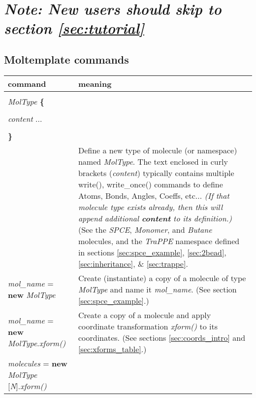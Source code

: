 \documentclass[11pt]{article}
\begin{document}
\section*{
\textit{Note: New users should skip to section \ref{sec:tutorial}}
}



\subsection{Moltemplate commands}

\begin{longtable}[h]{l|p{9cm}}
\textbf{command} & \textbf{meaning}
\\
\hline
\hline
\begin{tabular}[t]{l}
\\
\textit{MolType} \textbf{\{} \\
\\
\hspace{0.35cm} \textit{content} ... \\
\\
\textbf{\}} \\
\end{tabular}
& 
Define a new type of molecule (or namespace) named \textit{MolType}.
The text enclosed in curly brackets (\textit{content})
typically contains multiple write(), write\_once()
commands to define Atoms, Bonds, Angles, Coeffs, etc...
\textit{(If that molecule type exists already, 
then this will append additional \textbf{content} to its definition.)}
(See the \textit{SPCE}, \textit{Monomer}, and \textit{Butane} 
 molecules, and the \textit{TraPPE} namespace 
 defined in sections \ref{sec:spce_example}, \ref{sec:2bead},
 \ref{sec:inheritance}, \& \ref{sec:trappe}.
\\
\hline
\textit{mol\_name} = \textbf{new} \textit{MolType} &
Create (instantiate) a copy of a molecule of type \textit{MolType}
and name it \textit{mol\_name}.
(See section \ref{sec:spce_example}.)
\\
\hline
\textit{mol\_name} = \textbf{new} \textit{MolType}.\textit{xform()} &
Create a copy of a molecule and
apply coordinate transformation \textit{xform()} to its coordinates.
(See sections \ref{sec:coords_intro} and \ref{sec:xforms_table}.)
\\
\hline
\textit{molecules} = 
  \textbf{new} \textit{MolType} [\textit{N}].\textit{xform()}&

\end{longtable}
\end{document}
